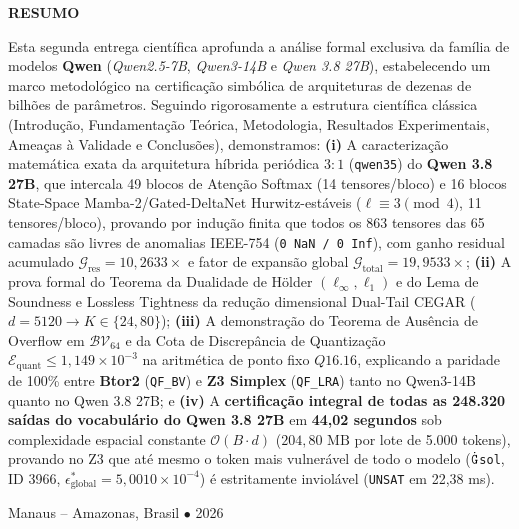 \documentclass[11pt,a4paper]{article}
\theoremstyle{definition}
\begin{document}
\begin{titlepage}
    \vspace{0.6cm}
    \begin{minipage}{0.98\textwidth}
        \footnotesize
        \begin{center}\textbf{RESUMO}\end{center}
        \noindent Esta segunda entrega científica aprofunda a análise formal exclusiva da família de modelos \textbf{Qwen} (\textit{Qwen2.5-7B}, \textit{Qwen3-14B} e \textit{Qwen 3.8 27B}), estabelecendo um marco metodológico na certificação simbólica de arquiteturas de dezenas de bilhões de parâmetros. Seguindo rigorosamente a estrutura científica clássica (Introdução, Fundamentação Teórica, Metodologia, Resultados Experimentais, Ameaças à Validade e Conclusões), demonstramos: \textbf{(i)} A caracterização matemática exata da arquitetura híbrida periódica $3:1$ (\texttt{qwen35}) do \textbf{Qwen 3.8 27B}, que intercala 49 blocos de Atenção Softmax (14 tensores/bloco) e 16 blocos State-Space Mamba-2/Gated-DeltaNet Hurwitz-estáveis ($\ell \equiv 3 \pmod 4$, 11 tensores/bloco), provando por indução finita que todos os 863 tensores das 65 camadas são livres de anomalias IEEE-754 (\texttt{0 NaN / 0 Inf}), com ganho residual acumulado $\mathcal{G}_{\text{res}} = 10{,}2633\times$ e fator de expansão global $\mathcal{G}_{\text{total}} = 19{,}9533\times$; \textbf{(ii)} A prova formal do Teorema da Dualidade de Hölder $(\ell_\infty, \ell_1)$ e do Lema de Soundness e Lossless Tightness da redução dimensional Dual-Tail CEGAR ($d=5120 \to K \in \{24, 80\}$); \textbf{(iii)} A demonstração do Teorema de Ausência de Overflow em $\mathcal{BV}_{64}$ e da Cota de Discrepância de Quantização $\mathcal{E}_{\text{quant}} \le 1{,}149 \times 10^{-3}$ na aritmética de ponto fixo $Q16.16$, explicando a paridade de 100\% entre \textbf{Btor2} (\texttt{QF\_BV}) e \textbf{Z3 Simplex} (\texttt{QF\_LRA}) tanto no Qwen3-14B quanto no Qwen 3.8 27B; e \textbf{(iv)} A \textbf{certificação integral de todas as 248.320 saídas do vocabulário do Qwen 3.8 27B} em \textbf{44,02 segundos} sob complexidade espacial constante $\mathcal{O}(B \cdot d)$ ($204{,}80\text{ MB}$ por lote de 5.000 tokens), provando no Z3 que até mesmo o token mais vulnerável de todo o modelo ($\dot{\text{\texttt{G}}}$\texttt{sol}, ID 3966, $\epsilon_{\text{global}}^* = 5{,}0010 \times 10^{-4}$) é estritamente inviolável (\texttt{UNSAT} em 22,38 ms).
    \end{minipage}
    
    \vfill
    {\small Manaus -- Amazonas, Brasil $\bullet$ 2026 \par}
\end{titlepage}
\end{document}
